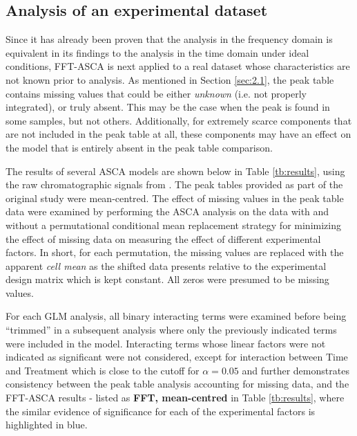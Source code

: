 \documentclass[preprint,12pt]{elsarticle}
\begin{document}
\subsection{Analysis of an experimental dataset}

Since it has already been proven that the analysis in the frequency domain is equivalent in its findings to the analysis in the time domain under ideal conditions, FFT-ASCA is next applied to a real dataset whose characteristics are not known prior to analysis. As mentioned in Section \ref{sec:2.1}, the peak table contains missing values that could be either \textit{unknown} (i.e. not properly integrated), or truly absent. This may be the case when the peak is found in some samples, but not others. Additionally, for extremely scarce components that are not included in the peak table at all, these components may have an effect on the model that is entirely absent in the peak table comparison.  

The results of several ASCA models are shown below in Table \ref{tb:results}, using the raw chromatographic signals from \cite{lo2023immune}.  The peak tables provided as part of the original study were mean-centred. The effect of missing values in the peak table data were examined by performing the ASCA analysis on the data with and without a permutational conditional mean replacement strategy for minimizing the effect of missing data on measuring the effect of different experimental factors. In short, for each permutation, the missing values are replaced with the apparent \textit{cell mean} as the shifted data presents relative to the experimental design matrix which is kept constant. All zeros were presumed to be missing values.

For each GLM analysis, all binary interacting terms were examined before being ``trimmed'' in a subsequent analysis where only the previously indicated terms were included in the model. Interacting terms whose linear factors were not indicated as significant were not considered, except for interaction between Time and Treatment which is close to the cutoff for $\alpha = 0.05$ and further demonstrates consistency between the peak table analysis accounting for missing data, and the FFT-ASCA results - listed as \textbf{FFT, mean-centred} in Table \ref{tb:results}, where the similar evidence of significance for each of the experimental factors is highlighted in blue. 
\end{document}
